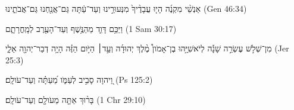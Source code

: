 
\begin{exe}

\ex\label{antdur_begintoend_exs1}
\texthebrew{
אַנְשֵׁ֨י מִקְנֶ֜ה הָי֤וּ עֲבָדֶ֨יךָ֙ מִנְּעוּרֵ֣ינוּ וְעַד־עַ֔תָּה גַּם־אֲנַ֖חְנוּ גַּם־אֲבֹתֵ֑ינוּ 
} (Gen 46:34)

\ex\label{antdur_begintoend_exs2}
\texthebrew{
וַיַּכֵּ֥ם דָּוִ֛ד מֵהַנֶּ֥שֶׁף וְעַד־הָעֶ֖רֶב לְמָֽחֳרָתָ֑ם 
} (1 Sam 30:17)

\ex\label{antdur_begintoend_exs3}
\texthebrew{
מִן־שְׁלֹ֣שׁ עֶשְׂרֵ֣ה שָׁנָ֡ה לְיֹאשִׁיָּ֣הוּ בֶן־אָמֹון֩ מֶ֨לֶךְ יְהוּדָ֜ה וְעַ֣ד׀ הַיֹּ֣ום הַזֶּ֗ה הָיָ֥ה דְבַר־יְהוָ֖ה אֵלָ֑י 
} (Jer 25:3)

\ex\label{antdur_begintoend_exs4}
\texthebrew{
וַ֭יהוָה סָבִ֣יב לְעַמֹּ֑ו מֵ֝עַתָּ֗ה וְעַד־עֹולָֽם׃ 
} (Ps 125:2)

\ex\label{antdur_begintoend_exs5}
\texthebrew{
בָּר֨וּךְ אַתָּ֤ה מֵעֹולָ֖ם וְעַד־עֹולָֽם׃ 
} (1 Chr 29:10)

\end{exe}

